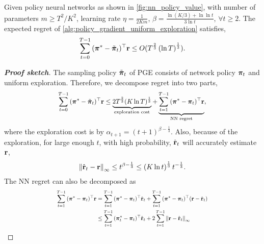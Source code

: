 \begin{thm}
	\label{thm:policy_gradient_main_result}
	Given policy neural networks as shown in \cref{fig:nn_policy_value}, with number of parameters $m \ge T^2 / K^2$, learning rate $\eta = \frac{1}{2 K m}$, $\beta = \frac{ \ln{(K/3) + \ln{\ln{t}} } }{ 3 \ln{t}}$, $\forall t \ge 2$. The expected regret of \cref{alg:policy_gradient_uniform_exploration} satisfies,
	\begin{equation*}
	\begin{split}
	\sum\limits_{t=0}^{T-1}{ ( {\boldsymbol{\pi}}^* - \tilde{{\boldsymbol{\pi}}}_t )^\top {\mathbf{r}}} \le O(T^{\frac{2}{3}}\left( \ln{T} \right)^{\frac{1}{3}}).
	\end{split}
	\end{equation*}
\end{thm}
\begin{proof}[\bf Proof sketch]
The sampling policy $\tilde{{\boldsymbol{\pi}}}_t$ of PGE consists of network policy ${\boldsymbol{\pi}}_t$ and uniform exploration. Therefore, we decompose regret into two parts,
\begin{equation}
 \label{eq:total_regret_decomposition}
 \scalemath{0.9}{
 \begin{split}
 \sum\limits_{t=0}^{T-1}{ ( \rvpi^* - \tilde{\rvpi}_t )^\top \rvr} \le \underbrace{ 2 T^{\frac{2}{3}} ( K \ln{T} )^{\frac{1}{3}} }_{\text{exploration cost}} + \underbrace{ \sum\limits_{t=1}^{T-1}{ ( {\rvpi^*} - \rvpi_t)^\top \rvr } }_{\text{NN regret}},
 \end{split}
 }
 \end{equation}
where the exploration cost is by $\alpha_{t+1} = \left(t+1\right)^{ \beta - \frac{1}{3}}$. Also, because of the exploration, for large enough $t$, with high probability, $\hat{{\mathbf{r}}}_t$ will accurately estimate ${\mathbf{r}}$,
\begin{equation*}
    \left\| \hat{{\mathbf{r}}}_t - {\mathbf{r}} \right\|_\infty \le t^{\beta - \frac{1}{3}} \le \left( K \ln{t} \right) ^\frac{1}{3} t^{- \frac{1}{3}}.
\end{equation*}
The NN regret can also be decomposed as
\begin{equation}
\label{eq:playing_learning_phase_regret_decomposition}
\scalemath{0.78}{
\begin{split}
\sum\limits_{t=1}^{T-1}{ ( {\rvpi^*} - \rvpi_t )^\top \rvr}  &= \sum\limits_{t=1}^{T-1}{ ( {\rvpi^*} - \rvpi_t )^\top \hat{\rvr}_t } + \sum\limits_{t=1}^{T-1}{ ( {\rvpi^*} - \rvpi_t )^\top ( \rvr - \hat{\rvr}_t ) }\\
&\le \sum\limits_{t=1}^{T-1}{ ( {\rvpi_t^*} - \rvpi_t )^\top \hat{\rvr}_t  } + 2 \sum\limits_{t=1}^{T-1}{ \left\| \rvr - \hat{\rvr}_t \right\|_\infty } \\

\end{split}}
\end{equation}
\end{proof}
